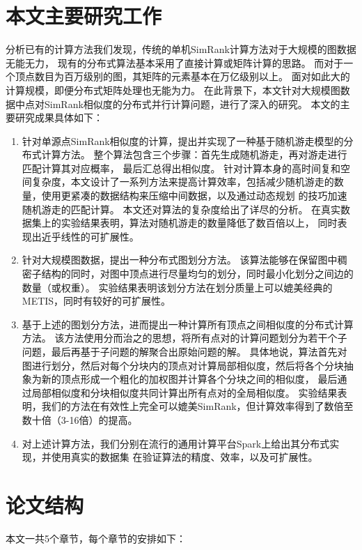 \documentclass[master]{njuthesis}
\begin{document}
\section{本文主要研究工作}
分析已有的计算方法我们发现，传统的单机SimRank计算方法对于大规模的图数据无能无力，
现有的分布式算法基本采用了直接计算或矩阵计算的思路。
而对于一个顶点数目为百万级别的图，其矩阵的元素基本在万亿级别以上。
面对如此大的计算规模，即便分布式矩阵处理也无能为力。
在此背景下，本文针对大规模图数据中点对SimRank相似度的分布式并行计算问题，进行了深入的研究。
本文的主要研究成果具体如下：
\begin{enumerate}
\item 针对单源点SimRank相似度的计算，提出并实现了一种基于随机游走模型的分布式计算方法。
整个算法包含三个步骤：首先生成随机游走，再对游走进行匹配计算其对应概率，
最后汇总得出相似度。
针对计算本身的高时间复和空间复杂度，本文设计了一系列方法来提高计算效率，包括减少随机游走的数量，使用更紧凑的数据结构来压缩中间数据，以及通过动态规划
的技巧加速随机游走的匹配计算。
本文还对算法的复杂度给出了详尽的分析。
在真实数据集上的实验结果表明，算法对随机游走的数量降低了数百倍以上，
同时表现出近乎线性的可扩展性。

\item 针对大规模图数据，提出一种分布式图划分方法。
该算法能够在保留图中稠密子结构的同时，对图中顶点进行尽量均匀的划分，同时最小化划分之间边的数量（或权重）。
实验结果表明该划分方法在划分质量上可以媲美经典的METIS，同时有较好的可扩展性。

\item 基于上述的图划分方法，进而提出一种计算所有顶点之间相似度的分布式计算方法。
该方法使用分而治之的思想，将所有点对的计算问题划分为若干个子问题，最后再基于子问题的解聚合出原始问题的解。
具体地说，算法首先对图进行划分，然后对每个分块内的顶点对计算局部相似度，然后将各个分块抽象为新的顶点形成一个粗化的加权图并计算各个分块之间的相似度，
最后通过局部相似度和分块相似度共同计算出所有点对的全局相似度。
实验结果表明，我们的方法在有效性上完全可以媲美SimRank，但计算效率得到了数倍至数十倍（3-16倍）的提高。

\item 对上述计算方法，我们分别在流行的通用计算平台Spark上给出其分布式实现，并使用真实的数据集
在验证算法的精度、效率，以及可扩展性。

\end{enumerate}
\section{论文结构}
本文一共5个章节，每个章节的安排如下：
\end{document}

